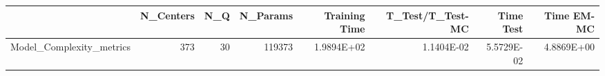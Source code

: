 \begin{tabular}{lrrrrrrr}
\toprule
{} &  N\_Centers &  N\_Q &  N\_Params &  Training Time &  T\_Test/T\_Test-MC &  Time Test &  Time EM-MC \\
\midrule
Model\_Complexity\_metrics &        373 &   30 &    119373 &     1.9894E+02 &        1.1404E-02 & 5.5729E-02 &  4.8869E+00 \\
\bottomrule
\end{tabular}
